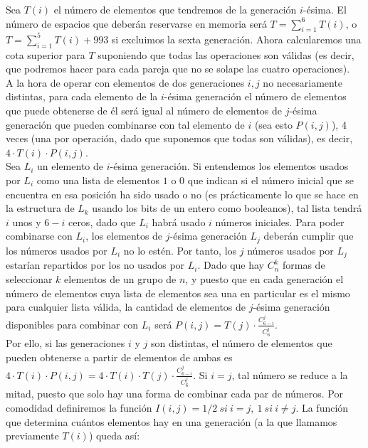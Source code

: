 Sea $T(i)$ el número de elementos que tendremos de la generación $i$-ésima. El número de espacios que deberán reservarse en memoria será $T = \displaystyle \sum_{i=1}^6 T(i)$, o $T = \displaystyle \sum_{i=1}^5 T(i) + 993$ si excluimos la sexta generación. Ahora calcularemos una cota superior para $T$ suponiendo que todas las operaciones son válidas (es decir, que podremos hacer para cada pareja que no se solape las cuatro operaciones).\\

A la hora de operar con elementos de dos generaciones $i,j$ no necesariamente distintas, para cada elemento de la $i$-ésima generación el número de elementos que puede obtenerse de él será igual al número de elementos de $j$-ésima generación que pueden combinarse con tal elemento de $i$ (sea esto $P(i,j)$), 4 veces (una por operación, dado que suponemos que todas son válidas), es decir, $4 \cdot T(i) \cdot P(i,j)$.\\

Sea $L_i$ un elemento de $i$-ésima generación. Si entendemos los elementos usados por $L_i$ como una lista de elementos $1$ o $0$ que indican si el número inicial que se encuentra en esa posición ha sido usado o no (es prácticamente lo que se hace en la estructura de $L_k$ usando los bits de un entero como booleanos), tal lista tendrá $i$ unos y $6-i$ ceros, dado que $L_i$ habrá usado $i$ números iniciales. Para poder combinarse con $L_i$, los elementos de $j$-ésima generación $L_j$ deberán cumplir que los números usados por $L_i$ no lo estén. Por tanto, los $j$ números usados por $L_j$ estarían repartidos por los no usados por $L_i$. Dado que hay $C_{n}^k$ formas de seleccionar $k$ elementos de un grupo de $n$, y puesto que en cada generación el número de elementos cuya lista de elementos sea una en particular es el mismo para cualquier lista válida, la cantidad de elementos de $j$-ésima generación disponibles para combinar con $L_i$ será $\displaystyle P(i,j) = T(j) \cdot \frac {C_{6-i}^j} {C_6^j}$.\\

Por ello, si las generaciones $i$ y $j$ son distintas, el número de elementos que pueden obtenerse a partir de elementos de ambas es $\displaystyle 4 \cdot T(i) \cdot P(i,j) = 4 \cdot T(i) \cdot T(j) \cdot \frac {C_{6-i}^j} {C_6^j}$. Si $i=j$, tal número se reduce a la mitad, puesto que solo hay una forma de combinar cada par de números. Por comodidad definiremos la función $I(i,j) = 1/2\ si\ i=j,\ 1\ si\ i \ne j$. La función que determina cuántos elementos hay en una generación (a la que llamamos previamente $T(i)$) queda así:

